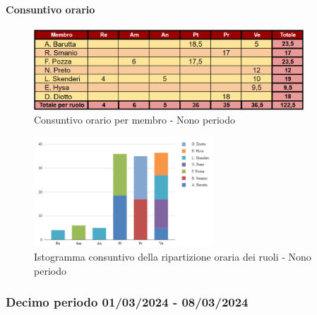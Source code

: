 \paragraph{Consuntivo orario}

\begin{figure}[H]
    \centering
    \includegraphics[width=0.9\textwidth]{../Images/consuntivoOrario9Periodo.png}
    \caption{Consuntivo orario per membro - Nono periodo}
    \label{fig:Constuntivo_orario_9}
\end{figure}

\begin{figure}[H]
    \centering
    \includegraphics[width=0.6\textwidth]{../Images/consuntivoDivisioneRuoli9Periodo.png}
    \caption{Istogramma consuntivo della ripartizione oraria dei ruoli - Nono periodo}
    \label{fig:Consuntivo_ripartizione_oraria_9}
\end{figure}


\subsubsection{Decimo periodo  01/03/2024 - 08/03/2024}

